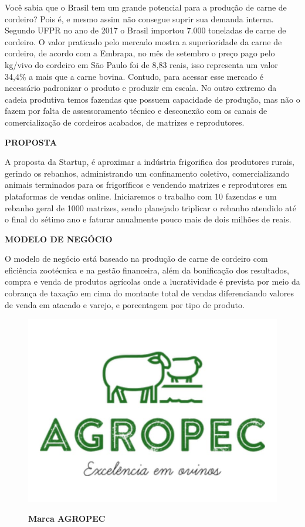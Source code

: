 Você sabia que o Brasil tem um grande potencial para a produção de carne de cordeiro? Pois é, e mesmo assim não consegue suprir 
sua demanda interna. Segundo UFPR no ano de 2017 o Brasil importou 7.000 toneladas de carne de cordeiro. O valor praticado pelo mercado mostra a superioridade da carne de cordeiro, de acordo com a Embrapa, no mês de setembro o preço pago pelo kg/vivo do cordeiro em São Paulo foi de 8,83 reais, isso representa um valor 34,4\% a mais que a carne 
bovina. Contudo, para acessar esse mercado é necessário padronizar o produto e produzir em escala. No outro extremo da cadeia produtiva temos fazendas que possuem capacidade de produção, mas não o fazem por falta de assessoramento técnico e desconexão com os canais  de comercialização de cordeiros acabados, de matrizes e reprodutores.

\textbf{PROPOSTA}

A proposta da Startup, é aproximar a indústria frigorifica dos  produtores rurais, gerindo os rebanhos, administrando um 
confinamento coletivo, comercializando animais terminados para os frigoríficos e vendendo matrizes e reprodutores em plataformas de vendas online. Iniciaremos o trabalho com 10 fazendas e um rebanho geral de 1000 matrizes, sendo planejado triplicar o rebanho atendido até o final do sétimo ano e faturar anualmente pouco mais de dois milhões de reais.

\textbf{MODELO DE NEGÓCIO}

O modelo de negócio está baseado na produção de carne de  cordeiro com eficiência zootécnica e na gestão financeira, além 
da bonificação dos resultados, compra e venda de produtos  agrícolas onde a lucratividade é prevista por meio da cobrança de taxação em cima do montante total de vendas diferenciando valores de venda em atacado e varejo, e porcentagem por tipo de produto.


\begin{figure}[!htb]
\centering
\caption{\textbf{Marca AGROPEC}}
\includegraphics[scale=0.2]{Imagens/agropec.jpg}
\label{figura_15}
\end{figure}
\newpage

